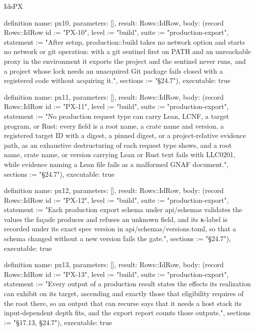 \begin{lexlean}{IdsPX}
\begin{semanticmodule}
definition{
  name: px10,
  parameters: [],
  result: Rows::IdRow,
  body: (record Rows::IdRow {id := "PX-10", level := "build", suite := "production-export", statement := "After setup, production::build takes no network option and starts no network or git operation: with a git sentinel first on PATH and an unreachable proxy in the environment it exports the project and the sentinel never runs, and a project whose lock needs an unacquired Git package fails closed with a registered code without acquiring it.", sections := "§24.7"}),
  executable: true
}

definition{
  name: px11,
  parameters: [],
  result: Rows::IdRow,
  body: (record Rows::IdRow {id := "PX-11", level := "build", suite := "production-export", statement := "No production request type can carry Lean, LCNF, a target program, or Rust: every field is a root name, a crate name and version, a registered target ID with a digest, a pinned digest, or a project-relative evidence path, as an exhaustive destructuring of each request type shows, and a root name, crate name, or version carrying Lean or Rust text fails with LLC0201, while evidence naming a Lean file fails as a malformed GNAF document.", sections := "§24.7"}),
  executable: true
}

definition{
  name: px12,
  parameters: [],
  result: Rows::IdRow,
  body: (record Rows::IdRow {id := "PX-12", level := "build", suite := "production-export", statement := "Each production export schema under api/schemas validates the values the façade produces and refuses an unknown field, and its κ-label is recorded under its exact spec version in api/schemas/versions.toml, so that a schema changed without a new version fails the gate.", sections := "§24.7"}),
  executable: true
}

definition{
  name: px13,
  parameters: [],
  result: Rows::IdRow,
  body: (record Rows::IdRow {id := "PX-13", level := "build", suite := "production-export", statement := "Every output of a production result states the effects its realization can exhibit on its target, ascending and exactly those that eligibility requires of the root there, so an output that can recurse says that it needs a host stack its input-dependent depth fits, and the export report counts those outputs.", sections := "§17.13, §24.7"}),
  executable: true
}
\end{semanticmodule}
\end{lexlean}
